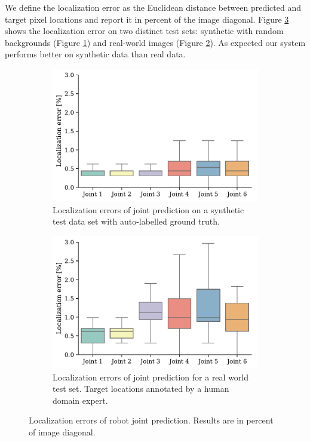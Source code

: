 \documentclass[conference]{IEEEtran}
\begin{document}
    We define the localization error as the Euclidean distance between predicted and target pixel locations and report it in percent of the image diagonal. Figure \ref{fig:pixelerror} shows the localization error on two distinct test sets: synthetic with random backgrounds (Figure \ref{fig:locationerror_synth}) and real-world images (Figure \ref{fig:locationerror_real}). As expected our system performs better on synthetic data than real data.
    \begin{figure}[!h]
        \centering
        \begin{subfigure}[t]{0.49\columnwidth}
            \includegraphics[width=\columnwidth]{figures/results/pixel_errors/pixel_error_synth.pdf}
            \caption {
                \label{fig:locationerror_synth} 
                Localization errors of joint prediction on a synthetic test data set with auto-labelled ground truth.
            }
        \end{subfigure}
        \begin{subfigure}[t]{0.49\columnwidth}
            \includegraphics[width=\columnwidth]{figures/results/pixel_errors/pixel_error_real.pdf}
            \caption {
                \label{fig:locationerror_real} 
                Localization errors of joint prediction for a real world test set. Target locations annotated by a human domain expert. 
            }
        \end{subfigure}
        \caption {
            \label{fig:pixelerror} 
            Localization errors of robot joint prediction. Results are in percent of image diagonal.
        }
    \end{figure}
\end{document}
